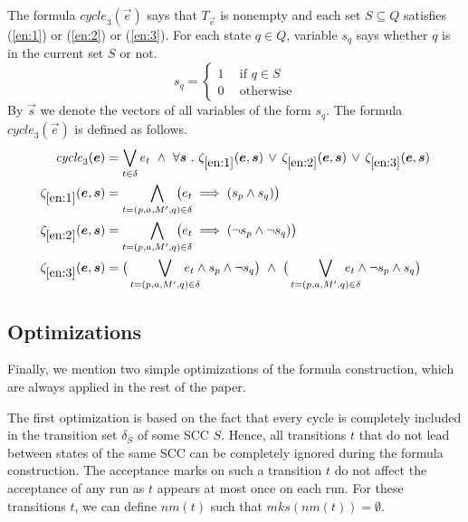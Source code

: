 \documentclass[runningheads]{llncs}
\newcommand{\mks}{\mathit{mks}}
\newcommand{\rem}{\mathit{nm}}
\newcommand{\mcycle}{\mathit{cycle}}
\newcommand{\Te}{T_{\vec{e}}}
\begin{document}
The formula $\mcycle_3(\vec{e})$ says that $\Te$ is nonempty and each
set $S\subseteq Q$ satisfies (\ref{en:1}) or (\ref{en:2}) or
(\ref{en:3}).  For each state $q\in Q$, variable $s_q$ says whether
$q$ is in the current set $S$ or not.
\[s_q=\left\{
    \begin{array}{ll}
      1~~ & \textrm{if }q\in S\\[.5ex]
      0 & \textrm{otherwise}    
    \end{array}\right.
\]
By $\vec{s}$ we denote the vectors of all variables of the form $s_q$.
The formula $\mcycle_3(\vec{e})$ is defined as follows.
\begin{align*}
  \mcycle_3(\vec{e})
  &=\bigvee_{t\in\delta}e_t~\wedge~\forall\vec{s}~.~\zeta_{\ref{en:1}}(\vec{e},\vec{s})\,\vee\,
    \zeta_{\ref{en:2}}(\vec{e},\vec{s})\,\vee\,
    \zeta_{\ref{en:3}}(\vec{e},\vec{s})\\ %
  \zeta_{\ref{en:1}}(\vec{e},\vec{s}) &= \bigwedge_{t=(p,a,M',q)\in\delta}\hspace{-5mm}\big(e_t\implies (s_p\wedge s_q)\big)\\
  \zeta_{\ref{en:2}}(\vec{e},\vec{s}) &= \bigwedge_{t=(p,a,M',q)\in\delta}\hspace{-5mm}\big(e_t\implies (\neg s_p\wedge \neg s_q)\big)\\
  \zeta_{\ref{en:3}}(\vec{e},\vec{s}) &= \big(\bigvee_{t=(p,a,M',q)\in\delta}\hspace{-5mm}e_t\wedge s_p\wedge \neg s_q\big) ~\wedge~
  \big(\bigvee_{t=(p,a,M',q)\in\delta}\hspace{-5mm}e_t\wedge \neg s_p\wedge s_q\big)
\end{align*}

\subsection{Optimizations}

Finally, we mention two simple optimizations of the formula
construction, which are always applied in the rest of the paper.

The first optimization is based on the fact that every cycle is
completely included in the transition set $\delta_S$ of some SCC
$S$. Hence, all transitions $t$ that do not lead between states of the
same SCC can be completely ignored during the formula
construction. The acceptance marks on such a transition $t$ do not
affect the acceptance of any run as $t$ appears at most once on each
run. For these transitions $t$, we can define $\rem(t)$ such that
$\mks(\rem(t))=\emptyset$.
\end{document}
